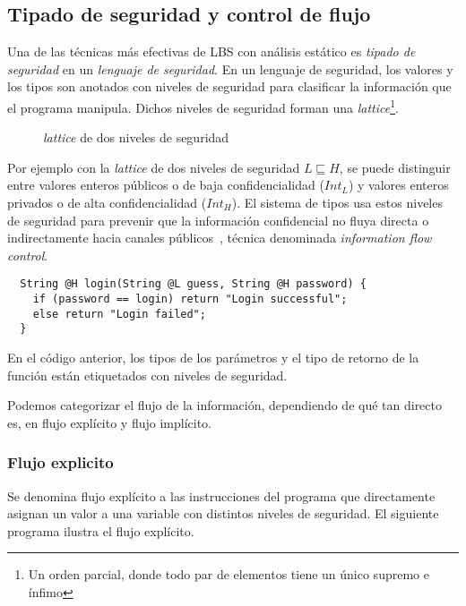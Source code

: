 \subsection{Tipado de seguridad y control de flujo} \label{sectype}
Una de las técnicas más efectivas de LBS con análisis estático es \textit{tipado de seguridad} en un \textit{lenguaje de seguridad}. En un lenguaje de seguridad, los valores y los tipos son anotados con niveles de seguridad para clasificar la información que el programa manipula. Dichos niveles de seguridad forman una \textit{lattice}\footnote{Un orden parcial, donde todo par de elementos tiene un único supremo e ínfimo}.

	\begin{figure}[ht]
		\centering
		\caption{\textit{lattice} de dos niveles de seguridad}
	\end{figure}


  	Por ejemplo con la \textit{lattice} de dos niveles de seguridad $L \sqsubseteq H$, se puede distinguir entre valores enteros públicos o de baja confidencialidad ($Int_L$) y valores enteros privados o de alta confidencialidad ($Int_H$). El sistema de tipos usa estos niveles de seguridad para prevenir que la información confidencial no fluya directa o indirectamente hacia canales públicos~\cite{volpanoAl:S96}, técnica denominada \textit{information flow control}.

  	\begin{lstlisting}
  String @H login(String @L guess, String @H password) {
  	if (password == login) return "Login successful";
  	else return "Login failed";
  }
  	\end{lstlisting}

    En el código anterior, los tipos de los parámetros y el tipo de retorno de la función están etiquetados con niveles de seguridad.

    Podemos categorizar el flujo de la información, dependiendo de qué tan directo es, en flujo explícito y flujo implícito.

\subsubsection{Flujo explicito}
Se denomina flujo explícito a las instrucciones del programa que directamente asignan un valor a una variable con distintos niveles de seguridad. El siguiente programa ilustra el flujo explícito.


